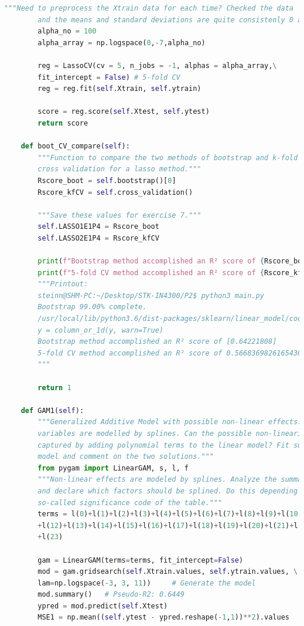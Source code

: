 \documentclass[]{article}
\begin{document}
\begin{lstlisting}[language=Python]
		"""Need to preprocess the Xtrain data for each time? Checked the data
		and the means and standard deviations are quite consistenly 0 and 1."""
		alpha_no = 100
		alpha_array = np.logspace(0,-7,alpha_no)
		
		reg = LassoCV(cv = 5, n_jobs = -1, alphas = alpha_array,\
		fit_intercept = False) # 5-fold CV
		reg = reg.fit(self.Xtrain, self.ytrain)
		
		score = reg.score(self.Xtest, self.ytest)
		return score
	
	def boot_CV_compare(self):
		"""Function to compare the two methods of bootstrap and k-fold
		cross validation for a lasso method."""
		Rscore_boot = self.bootstrap()[0]
		Rscore_kfCV = self.cross_validation()
		
		"""Save these values for exercise 7."""
		self.LASSO1E1P4 = Rscore_boot
		self.LASSO2E1P4 = Rscore_kfCV
		
		print(f"Bootstrap method accomplished an R² score of {Rscore_boot}")
		print(f"5-fold CV method accomplished an R² score of {Rscore_kfCV}")
		"""Printout:
		steinn@SHM-PC:~/Desktop/STK-IN4300/P2$ python3 main.py
		Bootstrap 99.00% complete.
		/usr/local/lib/python3.6/dist-packages/sklearn/linear_model/coordinate_descent.py:1100: DataConversionWarning: A column-vector y was passed when a 1d array was expected. Please change the shape of y to (n_samples, ), for example using ravel().
		y = column_or_1d(y, warn=True)
		Bootstrap method accomplished an R² score of [0.64221808]
		5-fold CV method accomplished an R² score of 0.5668369826165436
		"""
		
		return 1
	
	def GAM1(self):
		"""Generalized Additive Model with possible non-linear effects. Specific
		variables are modelled by splines. Can the possible non-linearities be
		captured by adding polynomial terms to the linear model? Fit such a
		model and comment on the two solutions."""
		from pygam import LinearGAM, s, l, f
		"""Non-linear effects are modeled by splines. Analyze the summary table
		and declare which factors should be splined. Do this depending on the
		so-called significance code of the table."""
		terms = l(0)+l(1)+l(2)+l(3)+l(4)+l(5)+l(6)+l(7)+l(8)+l(9)+l(10)+l(11)\
		+l(12)+l(13)+l(14)+l(15)+l(16)+l(17)+l(18)+l(19)+l(20)+l(21)+l(22)\
		+l(23)
		
		gam = LinearGAM(terms=terms, fit_intercept=False)
		mod = gam.gridsearch(self.Xtrain.values, self.ytrain.values, \
		lam=np.logspace(-3, 3, 11))     # Generate the model
		mod.summary()   # Pseudo-R2: 0.6449
		ypred = mod.predict(self.Xtest)
		MSE1 = np.mean((self.ytest - ypred.reshape(-1,1))**2).values
		

\end{lstlisting}
\end{document}
